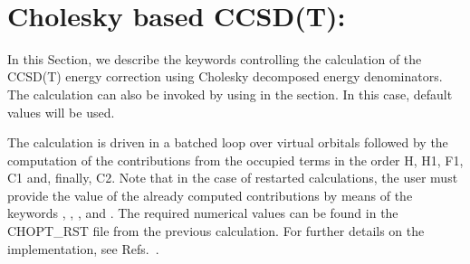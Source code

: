 ~%
\section{Cholesky based CCSD(T): }
\label{sec:chopt}

In this Section, we describe the keywords controlling the calculation of the 
CCSD(T) energy correction using Cholesky decomposed energy denominators. The
calculation can also be invoked by using  in the  
section. In this case, default values will be used. 


The calculation is driven in a batched loop over virtual orbitals followed by
the computation of the contributions from the occupied terms in the order 
H, H1, F1, C1 and, finally, C2. Note that in the case of restarted calculations,
the user must provide the value of the already computed contributions by means 
of the keywords , , , and .
The required numerical values can be found in the CHOPT\_RST file from the
previous calculation.
For further details on the implementation, see 
Refs.~\cite{jcp_chopt,ijqc_chopt}.

\begin{center}
\end{center}

